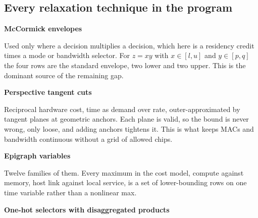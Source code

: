 \documentclass[10pt]{article}
\begin{document}
\subsection{Every relaxation technique in the program}
\begin{tcbraster}[raster columns=2,raster column skip=5pt,raster equal height=rows,
  raster before skip=5pt,raster after skip=4pt]
\begin{tcolorbox}[cardstyle,breakable=false]
{\sffamily\bfseries\fontsize{10}{12}\selectfont McCormick envelopes}\par\vspace{3pt}
{\color{ink2}\fontsize{8.8}{11}\selectfont Used only where a decision
multiplies a decision, which here is a residency credit times a mode or
bandwidth selector. For $z=xy$ with $x\in[l,u]$ and $y\in[p,q]$ the four rows
are the standard envelope, two lower and two upper. This is the dominant source
of the remaining gap.\par}
\end{tcolorbox}
\begin{tcolorbox}[cardstyle,breakable=false]
{\sffamily\bfseries\fontsize{10}{12}\selectfont Perspective tangent cuts}\par\vspace{3pt}
{\color{ink2}\fontsize{8.8}{11}\selectfont Reciprocal hardware cost, time as
demand over rate, outer-approximated by tangent planes at geometric anchors.
Each plane is valid, so the bound is never wrong, only loose, and adding
anchors tightens it. This is what keeps MACs and bandwidth continuous without a
grid of allowed chips.\par}
\end{tcolorbox}
\begin{tcolorbox}[cardstyle,breakable=false]
{\sffamily\bfseries\fontsize{10}{12}\selectfont Epigraph variables}\par\vspace{3pt}
{\color{ink2}\fontsize{8.8}{11}\selectfont Twelve families of them. Every
maximum in the cost model, compute against memory, host link against local
service, is a set of lower-bounding rows on one time variable rather than a
nonlinear max.\par}
\end{tcolorbox}
\begin{tcolorbox}[cardstyle,breakable=false]
{\sffamily\bfseries\fontsize{10}{12}\selectfont One-hot selectors with disaggregated products}\par\vspace{3pt}

\end{tcolorbox}
\end{tcbraster}
\end{document}
